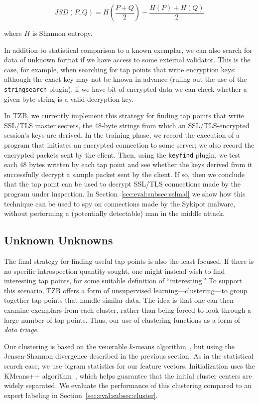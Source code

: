 \[
JSD(P, Q) = H \left ( \frac{P+Q}{2} \right ) - \frac{H(P)+H(Q)}{2}
\]

\noindent where $H$ is Shannon entropy.

In addition to statistical comparison to a known exemplar, we can also
search for data of unknown format if we have access to some external
validator. This is the case, for example, when searching for tap points
that write encryption keys: although the exact key may not be known in
advance (ruling out the use of the \texttt{stringsearch} plugin), if we
have bit of encrypted data we can check whether a given byte string is a
valid decryption key.

In TZB, we currently implement this strategy for finding tap points that
write SSL/TLS master secrets, the 48-byte strings from which an
SSL/TLS-encrypted session's keys are derived. In the training phase, we
record the execution of a program that initiates an encrypted connection
to some server; we also record the encrypted packets sent by the client.
Then, using the \texttt{keyfind} plugin, we test each 48 bytes written
by each tap point and see whether the keys derived from it successfully
decrypt a sample packet sent by the client. If so, then we conclude that
the tap point can be used to decrypt SSL/TLS connections made by the
program under inspection. In Section~\ref{sec:eval:subsec:sslmal} we show
how this technique can be used to spy on connections made by the Sykipot
malware, without performing a (potentially detectable) man in the middle
attack.

\subsection{Unknown Unknowns}

The final strategy for finding useful tap points is also the least
focused. If there is no specific introspection quantity sought, one
might instead wish to find interesting tap points, for some suitable
definition of ``interesting.'' To support this scenario, TZB offers a
form of unsupervised learning---clustering---to group together tap
points that handle similar data. The idea is that one can then examine
exemplars from each cluster, rather than being forced to look through a
large number of tap points. Thus, our use of clustering functions as a
form of \emph{data triage}.

Our clustering is based on the venerable $k$-means
algorithm~\cite{Steinhaus:1956kx}, but using the Jensen-Shannon
divergence described in the previous section. As in the statistical
search case, we use bigram statistics for our feature vectors.
Initialization uses the KMeans++ algorithm~\cite{Arthur:2007ve}, which
helps guarantee that the initial cluster centers are widely separated.
We evaluate the performance of this clustering compared to an expert
labeling in Section~\ref{sec:eval:subsec:cluster}.
